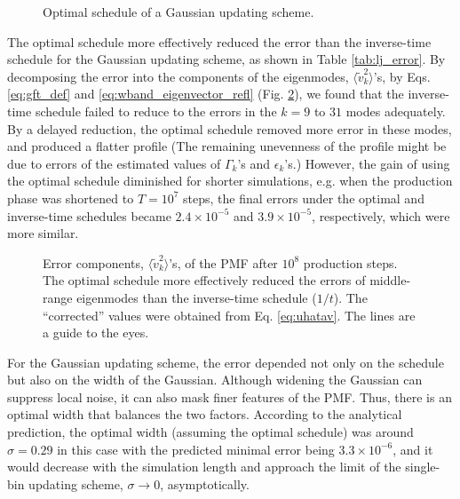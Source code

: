 \documentclass[reprint, superscriptaddress, floatfix]{revtex4-1}
\begin{document}
\begin{figure}[h]\centering
  \caption{
    \label{fig:lj_alpha}
    Optimal schedule of a Gaussian updating scheme.
  }
\end{figure}

The optimal schedule more effectively reduced
the error than the inverse-time schedule
for the Gaussian updating scheme,
as shown in Table \ref{tab:lj_error}.
%
By decomposing the error
into the components of the eigenmodes,
$\langle \tilde v_k^2 \rangle$'s,
by Eqs. \eqref{eq:gft_def} and \eqref{eq:wband_eigenvector_refl}
(Fig. \ref{fig:lj_xerr}),
we found that the inverse-time schedule
failed to reduce to the errors in the $k = 9$ to $31$ modes adequately.
%
By a delayed reduction,
the optimal schedule removed
more error in these modes,
and produced a flatter profile
(The remaining unevenness of the profile
might be due to errors of the estimated values of
$\Gamma_k$'s and $\epsilon_k$'s.)
%
However, the gain of using the optimal schedule
diminished for shorter simulations,
e.g. when the production phase was shortened to $T = 10^7$ steps,
the final errors under the optimal and inverse-time schedules
became $2.4\times 10^{-5}$ and $3.9\times 10^{-5}$, respectively,
which were more similar.

\begin{figure}[h]\centering
  \caption{
    \label{fig:lj_xerr}
    Error components,
    $\langle \tilde v_k^2 \rangle$'s,
    of the PMF after $10^8$ production steps.
    The optimal schedule more effectively
    reduced the errors of middle-range eigenmodes
    than the inverse-time schedule ($1/t$).
    The ``corrected'' values were obtained from
    Eq. \eqref{eq:uhatav}.
    The lines are a guide to the eyes.
  }
\end{figure}


For the Gaussian updating scheme,
the error depended not only on the schedule
but also on the width of the Gaussian.
%
Although widening the Gaussian
can suppress local noise,
it can also mask finer features of the PMF.\cite{laio2005}
%
Thus, there is an optimal width that balances the two factors.
%
According to the analytical prediction,
the optimal width (assuming the optimal schedule)
was around $\sigma = 0.29$ in this case
with the predicted minimal error being $3.3\times 10^{-6}$,
and it would decrease with the simulation length
and approach the limit of the single-bin updating scheme,
$\sigma \to 0$, asymptotically.
\end{document}
